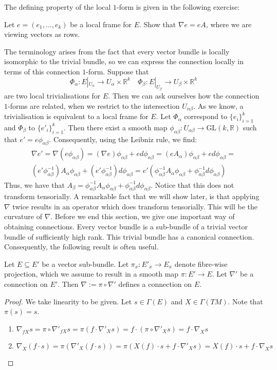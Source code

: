 The defining property of the local $1$-form is given in the following exercise:
\begin{exercise}\label{local}
  Let $e=(e_1,\dots,e_k)$ be a local frame for $E$. Show that $\nabla e=eA$, where we are viewing vectors as rows.
\end{exercise}
The terminology arises from the fact that every vector bundle is locally isomorphic to the trivial bundle, so we can express the connection locally in terms of this connection $1$-form. Suppose that
$$\Phi_\alpha:E|_{U_\alpha}\to U_\alpha\times\mathbb{R}^k\quad \Phi_\beta:E|_{U_\beta}\to U_\beta\times\mathbb{R}^k$$
are two local trivialisations for $E$. Then we can ask ourselves how the connection $1$-forms are related, when we restrict to the intersection $U_{\alpha\beta}$. As we know, a trivialisation is equivalent to a local frame for $E$. Let $\Phi_\alpha$ correspond to $\{e_i\}_{i=1}^k$ and $\Phi_\beta$ to $\{e'_i\}_{i=1}^k$. Then there exist a smooth map $\phi_{\alpha\beta}:U_{\alpha\beta}\to\text{GL}(k,\mathbb{R})$ such that $e'=e\phi_{\alpha\beta}$. Consequently, using the Leibniz rule, we find:
\begin{align*}
  \nabla e'=\nabla (e\phi_{\alpha\beta})=(\nabla e)\phi_{\alpha\beta}+ed\phi_{\alpha\beta}=
  (eA_\alpha)\phi_{\alpha\beta}+ed\phi_{\alpha\beta}=\\(e'\phi_{\alpha\beta}^{-1})A_\alpha\phi_{\alpha\beta}+(e'\phi_{\alpha\beta}^{-1})d\phi_{\alpha\beta}=e'(\phi_{\alpha\beta}^{-1}A_\alpha\phi_{\alpha\beta}+\phi_{\alpha\beta}^{-1}d\phi_{\alpha\beta})
\end{align*}
Thus, we have that $A_\beta=\phi_{\alpha\beta}^{-1}A_\alpha \phi_{\alpha\beta}+\phi_{\alpha\beta}^{-1}d\phi_{\alpha\beta}$. Notice that this does not transform tensorially. A remarkable fact that we will show later, is that applying $\nabla$ twice results in an operator which does transform tensorially. This will be the curvature of $\nabla$. Before we end this section, we give one important way of obtaining connections. Every vector bundle is a sub-bundle of a trivial vector bundle of sufficiently high rank. This trivial bundle has a canonical connection. Consequently, the following result is often useful.
\begin{proposition}\label{projection}
  Let $E\subseteq E'$ be a vector sub-bundle. Let $\pi_x:E'_x\to E_x$ denote fibre-wise projection, which we assume to result in a smooth map $\pi:E'\to E$. Let $\nabla'$ be a connection on $E'$. Then $\nabla:=\pi\circ\nabla'$ defines a connection on $E$.
\end{proposition}
\begin{proof}
  We take linearity to be given. Let $s\in\Gamma(E)$ and $X\in\Gamma(TM)$. Note that $\pi(s)=s$.
  \begin{enumerate}
    \item $\nabla_{fX}s=\pi\circ\nabla'_{fX}s=\pi(f\cdot\nabla'_Xs)=f\cdot(\pi\circ\nabla'_Xs)=f\cdot\nabla_Xs$
    \item $\nabla_X(f\cdot s)=\pi(\nabla'_X(f\cdot s))=\pi(X(f)\cdot s+f\cdot\nabla'_Xs)=X(f)\cdot s+f\cdot\nabla_Xs$
  \end{enumerate}
\end{proof}

